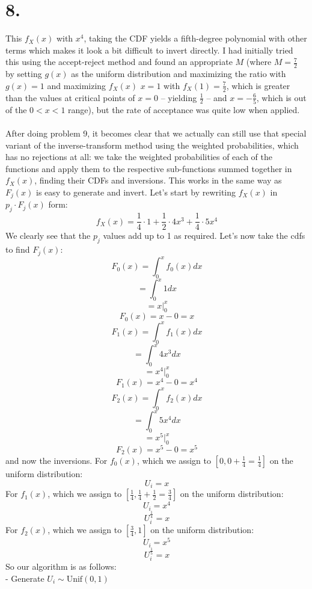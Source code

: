 \documentclass{article}
\begin{document}
{\Large 

\section*{8.}

This \(f_X(x)\) with \(x^4\), taking the CDF yields a fifth-degree polynomial with other terms which makes it look a bit difficult to invert directly. I had initially tried this using the accept-reject method and found an appropriate \(M\) (where \(M = \frac{7}{2}\) by setting \(g(x)\) as the uniform distribution and maximizing the ratio with \(g(x) = 1\) and maximizing \(f_X(x)\) \(x = 1\) with \(f_X(1) = \frac{7}{2}\), which is greater than the values at critical points of \(x=0\) -- yielding \(\frac{1}{2}\) -- and \(x=-\frac{6}{5}\), which is out of the \(0 < x < 1\) range), but the rate of acceptance was quite low when applied. \\ \\
After doing problem 9, it becomes clear that we actually can still use that special variant of the inverse-transform method using the weighted probabilities, which has no rejections at all: we take the weighted probabilities of each of the functions and apply them to the respective sub-functions summed together in \(f_X(x)\), finding their CDFs and inversions. This works in the same way as \(F_j(x)\) is easy to generate and invert. Let's start by rewriting \(f_X(x)\) in \(p_j \cdot F_j(x)\) form:
\[
  f_X(x) = \frac{1}{4} \cdot 1 + \frac{1}{2} \cdot 4x^3 + \frac{1}{4} \cdot 5x^4
\]
We clearly see that the \(p_j\) values add up to 1 as required. Let's now take the cdfs to find \(F_j(x)\):
\[
  F_0(x) = \int_0^x f_0(x) dx
\]
\[
  = \int_0^x 1 dx
\]
\[
  = x |_0^x
\]
\[
  F_0(x) = x - 0 = x
\]
\[
  F_1(x) = \int_0^x f_1(x) dx
\]
\[
  = \int_0^x 4x^3 dx
\]
\[
  = x^4 |_0^x
\]
\[
  F_1(x) = x^4 - 0 = x^4
\]
\[
  F_2(x) = \int_0^x f_2(x) dx
\]
\[
  = \int_0^x 5x^4 dx
\]
\[
  = x^5 |_0^x
\]
\[
  F_2(x) = x^5 - 0 = x^5
\]
and now the inversions. For \(f_0(x)\), which we assign to \([0, 0 + \frac{1}{4} = \frac{1}{4}]\) on the uniform distribution:
\[
  U_i = x
\]
For \(f_1(x)\), which we assign to \([\frac{1}{4}, \frac{1}{4} + \frac{1}{2} = \frac{3}{4}]\) on the uniform distribution:
\[
  U_i = x^4
\]
\[
  U_i^{\frac{1}{4}} = x
\]
For \(f_2(x)\), which we assign to \([\frac{3}{4}, 1]\) on the uniform distribution:
\[
  U_i = x^5
\]
\[
  U_i^{\frac{1}{5}} = x
\]
So our algorithm is as follows: \\ 
- Generate \(U_i \sim \text{Unif}(0,1)\) \\
}
\end{document}
